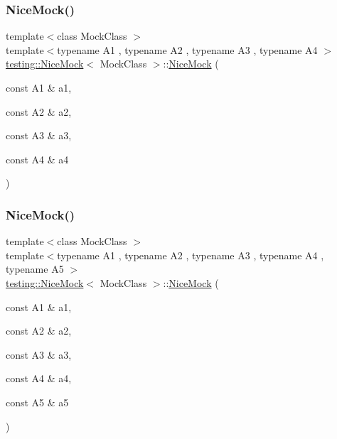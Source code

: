 \subsubsection{\texorpdfstring{NiceMock()}{NiceMock()}\hspace{0.1cm}{\footnotesize\ttfamily [5/11]}}
{\footnotesize\ttfamily template$<$class Mock\+Class $>$ \\
template$<$typename A1 , typename A2 , typename A3 , typename A4 $>$ \\
\mbox{\hyperlink{classtesting_1_1NiceMock}{testing\+::\+Nice\+Mock}}$<$ Mock\+Class $>$\+::\mbox{\hyperlink{classtesting_1_1NiceMock}{Nice\+Mock}} (\begin{DoxyParamCaption}\item[{const A1 \&}]{a1,  }\item[{const A2 \&}]{a2,  }\item[{const A3 \&}]{a3,  }\item[{const A4 \&}]{a4 }\end{DoxyParamCaption})\hspace{0.3cm}{\ttfamily [inline]}}

\mbox{\label{classtesting_1_1NiceMock_a3812c0ba0d743f9a0c3d276dfc076f4c}} 
\subsubsection{\texorpdfstring{NiceMock()}{NiceMock()}\hspace{0.1cm}{\footnotesize\ttfamily [6/11]}}
{\footnotesize\ttfamily template$<$class Mock\+Class $>$ \\
template$<$typename A1 , typename A2 , typename A3 , typename A4 , typename A5 $>$ \\
\mbox{\hyperlink{classtesting_1_1NiceMock}{testing\+::\+Nice\+Mock}}$<$ Mock\+Class $>$\+::\mbox{\hyperlink{classtesting_1_1NiceMock}{Nice\+Mock}} (\begin{DoxyParamCaption}\item[{const A1 \&}]{a1,  }\item[{const A2 \&}]{a2,  }\item[{const A3 \&}]{a3,  }\item[{const A4 \&}]{a4,  }\item[{const A5 \&}]{a5 }\end{DoxyParamCaption})\hspace{0.3cm}{\ttfamily [inline]}}


